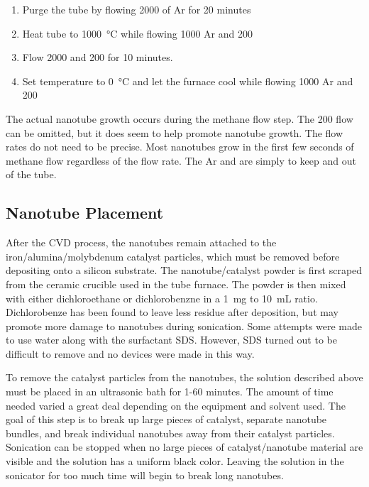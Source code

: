\begin{enumerate}
	\item Purge the tube by flowing \SI{2000}{\sccm} of Ar for 20 minutes
	\item Heat tube to \SI{1000}{\degreeCelsius} while flowing \SI{1000}{\sccm} Ar and \SI{200}{\sccm} 
	\item Flow \SI{2000}{\sccm}  and \SI{200}{\sccm}  for 10 minutes.
	\item Set temperature to \SI{0}{\degreeCelsius} and let the furnace cool while flowing \SI{1000}{\sccm} Ar and \SI{200}{\sccm} 
\end{enumerate}

\noindent The actual nanotube growth occurs during the methane flow step. The \SI{200}{\sccm}  flow can be omitted, but it does seem to help promote nanotube growth. The flow rates do not need to be precise. Most nanotubes grow in the first few seconds of methane flow regardless of the flow rate. The Ar and  are simply to keep  and  out of the tube. 

\subsection{Nanotube Placement}

After the CVD process, the nanotubes remain attached to the iron\slash alumina\slash molybdenum catalyst particles, which must be removed before depositing onto a silicon substrate. The nanotube\slash catalyst powder is first scraped from the ceramic crucible used in the tube furnace. The powder is then mixed with either dichloroethane or dichlorobenzne in a \SI{1}{\milli\gram} to \SI{10}{\milli\liter} ratio. Dichlorobenze has been found to leave less residue after deposition, but may promote more damage to nanotubes during sonication. Some attempts were made to use water along with the surfactant SDS. However, SDS turned out to be difficult to remove and no devices were made in this way.

To remove the catalyst particles from the nanotubes, the solution described above must be placed in an ultrasonic bath for 1-60 minutes. The amount of time needed varied a great deal depending on the equipment and solvent used. The goal of this step is to break up large pieces of catalyst, separate nanotube bundles, and break individual nanotubes away from their catalyst particles. Sonication can be stopped when no large pieces of catalyst\slash nanotube material are visible and the solution has a uniform black color. Leaving the solution in the sonicator for too much time will begin to break long nanotubes. 

